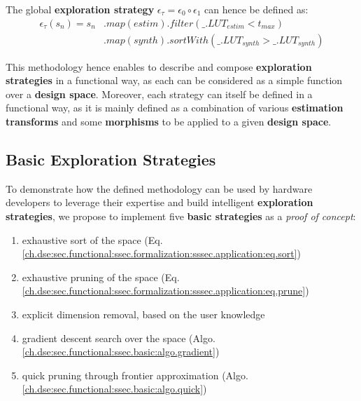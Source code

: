             \noindent The global {\bf exploration strategy} $\epsilon_\tau = \epsilon_0 \circ \epsilon_1$ can hence be defined as:
            \begin{equation}
                \label{ch.dse:sec.functional:ssec.formalization:sssec.application:eq.tau}
                \begin{split}
                    \epsilon_\tau(s_n) = s_n&.map(estim).filter(\_.LUT_{estim} < t_{max})\\
                                            &.map(synth).sortWith(\_.LUT_{synth} > \_.LUT_{synth})
                \end{split}
            \end{equation}

\clearpage
        This methodology hence enables to describe and compose {\bf exploration strategies} in a functional way, as each can be considered as a simple function over a {\bf design space}.
        Moreover, each strategy can itself be defined in a functional way, as it is mainly defined as a combination of various {\bf estimation transforms} and some {\bf morphisms} to be applied to a given {\bf design space}.

    \subsection{Basic Exploration Strategies}
    \label{ch.dse:sec.functional:ssec.basic}

        To demonstrate how the defined methodology can be used by hardware developers to leverage their expertise and build intelligent {\bf exploration strategies}, we propose to implement five {\bf basic strategies} as a {\it proof of concept}:
        \begin{enumerate}
            \setlength\itemsep{-.4em}
            \item exhaustive sort of the space (Eq. \ref{ch.dse:sec.functional:ssec.formalization:sssec.application:eq.sort})
            \item exhaustive pruning of the space (Eq. \ref{ch.dse:sec.functional:ssec.formalization:sssec.application:eq.prune})
            \item explicit dimension removal, based on the user knowledge
            \item gradient descent search over the space (Algo. \ref{ch.dse:sec.functional:ssec.basic:algo.gradient})
            \item quick pruning through frontier approximation (Algo. \ref{ch.dse:sec.functional:ssec.basic:algo.quick})
        \end{enumerate}

